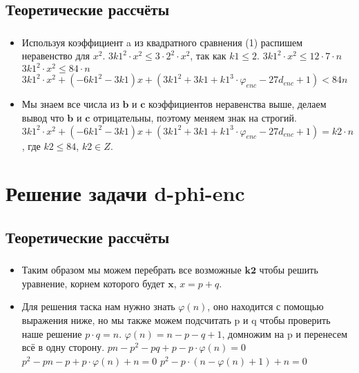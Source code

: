 \documentclass[t]{beamer}
\begin{document}
\subsection{Теоретические рассчёты}
\begin{frame}[t] %
	\frametitle{\insertsection}
	\framesubtitle{\insertsubsection}
        \begin{itemize}
            \item Используя коэффициент a из квадратного сравнения (1) распишем неравенство для $x^2$.\newline
            $3k1^2 \cdot x^2 \leq 3 \cdot 2^2 \cdot x^2$, так как $k1 \leq 2$.\newline
            $3k1^2 \cdot x^2 \leq 12 \cdot 7 \cdot n$\newline
            $3k1^2 \cdot x^2 \leq 84 \cdot n$\newline
            $3k1^2 \cdot x^2+(-6k1^2-3k1)x+(3k1^2+3k1+k1^3 \cdot \varphi_{enc}-27d_{enc}+1) < 84n$\newline
            \item Мы знаем все числа из $\boldsymbol{b}$ и $\boldsymbol{c}$ коэффициентов неравенства выше, делаем вывод что $\boldsymbol{b}$ и $\boldsymbol{c}$ отрицательны, поэтому меняем знак на строгий.\newline
            $3k1^2 \cdot x^2+(-6k1^2-3k1)x+(3k1^2+3k1+k1^3 \cdot \varphi_{enc}-27d_{enc}+1)=k2 \cdot n$,
            где $k2 \leq 84$, $k2 \in Z$.
	\end{itemize}
\end{frame}

\section{Решение задачи d-phi-enc}
\subsection{Теоретические рассчёты}
\begin{frame}[t] %
	\frametitle{\insertsection}
	\framesubtitle{\insertsubsection}
        \begin{itemize}
            \item Таким образом мы можем перебрать все возможные $\boldsymbol{k2}$ чтобы решить уравнение, корнем которого будет $\boldsymbol{x}$, $x=p+q$.
            \item Для решения таска нам нужно знать $\varphi(n)$, оно находится с помощью выражения ниже, но мы также можем подсчитать p и q чтобы проверить наше решение $p \cdot q=n$.\newline
            $\varphi(n)=n-p-q+1$, домножим на p и перенесем всё в одну сторону.\newline\newline
            $pn-p^2-pq+p-p \cdot \varphi(n)=0$\newline
            $p^2-pn-p+p \cdot \varphi(n)+n=0$\newline
            $p^2-p \cdot (n-\varphi(n)+1)+n=0$
	\end{itemize}
\end{frame}
\end{document}
